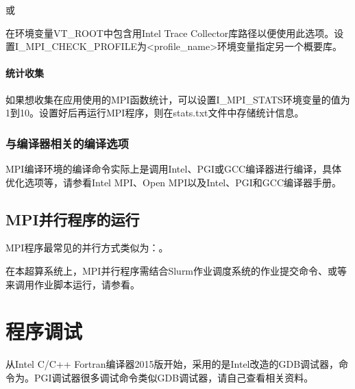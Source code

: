 \documentclass[a4paper,12pt,english]{sphinxmanual}
\begin{document}
\sphinxAtStartPar
{}

\sphinxAtStartPar
或

\sphinxAtStartPar
{}

\sphinxAtStartPar
在环境变量VT\_ROOT中包含用Intel Trace Collector库路径以便使用此选项。设置I\_MPI\_CHECK\_PROFILE为<profile\_name>环境变量指定另一个概要库。


\subsubsection{统计收集}
\label{\detokenize{mpi-application/mpi-application:id15}}
\sphinxAtStartPar
如果想收集在应用使用的MPI函数统计，可以设置I\_MPI\_STATS环境变量的值为1到10。设置好后再运行MPI程序，则在stats.txt文件中存储统计信息。


\subsection{与编译器相关的编译选项}
\label{\detokenize{mpi-application/mpi-application:id16}}
\sphinxAtStartPar
MPI编译环境的编译命令实际上是调用Intel、PGI或GCC编译器进行编译，具体优化选项等，请参看Intel
MPI、Open MPI以及Intel、PGI和GCC编译器手册。


\section{MPI并行程序的运行}
\label{\detokenize{mpi-application/mpi-application:id17}}
\sphinxAtStartPar
MPI程序最常见的并行方式类似为：。

\sphinxAtStartPar
在本超算系统上，MPI并行程序需结合Slurm作业调度系统的作业提交命令、或等来调用作业脚本运行，请参看。

\sphinxstepscope


\chapter{程序调试}
\label{\detokenize{debug/debug:id1}}\label{\detokenize{debug/debug::doc}}
\sphinxAtStartPar
从Intel C/C++ Fortran编译器2015版开始，采用的是Intel改造的GDB调试器，命令为。PGI调试器很多调试命令类似GDB调试器，请自己查看相关资料。
\end{document}
